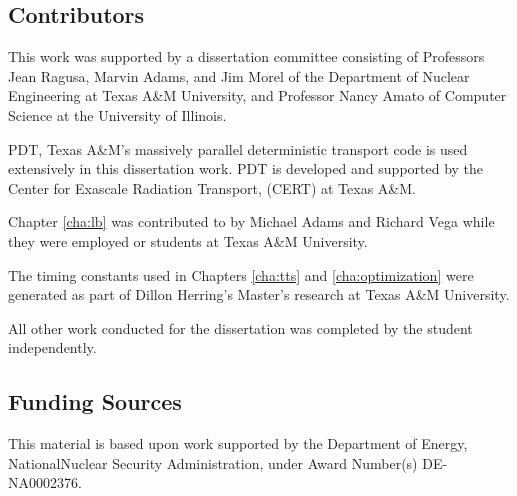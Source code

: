 \subsection*{Contributors}
This work was supported by a dissertation committee consisting of Professors Jean Ragusa, Marvin Adams, and Jim Morel of the Department of Nuclear Engineering at Texas A\&M University, and Professor Nancy Amato of Computer Science at the University of Illinois.

PDT, Texas A\&M's massively parallel deterministic transport code is used extensively in this dissertation work.
PDT is developed and supported by the Center for Exascale Radiation Transport, (CERT) at Texas A\&M.

Chapter \ref{cha:lb} was contributed to by Michael Adams and Richard Vega while they were employed or students at Texas A\&M University. 

The timing constants used in Chapters \ref{cha:tts} and \ref{cha:optimization} were generated as part of Dillon Herring's Master's research at Texas A\&M University. 

All other work conducted for the dissertation was completed by the student independently.
\subsection*{Funding Sources}
This material is based upon work supported by the Department of Energy, NationalNuclear Security Administration, under Award Number(s) DE-NA0002376.
\pagebreak{}